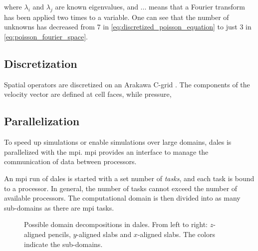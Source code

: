 where $\lambda_i$ and $\lambda_j$ are known eigenvalues, and ...  means that a Fourier transform has been applied two times to a variable. One can see that the number of unknowns has decreased from 7 in \autoref{eq:discretized_poisson_equation} to just 3 in \autoref{eq:poisson_fourier_space}. 

\subsection{Discretization}
Spatial operators are discretized on an Arakawa C-grid \citep{arakawaComputationalDesignBasic1977}. The components of the velocity vector are defined at cell faces, while pressure, 

\subsection{Parallelization}
To speed up simulations or enable simulations over large domains, \acrshort{dales} is parallelized with the \acrfull{mpi}. \acrshort{mpi} provides an interface to manage the communication of data between processors. 

An \acrshort{mpi} run of \acrshort{dales} is started with a set number of \emph{tasks}, and each task is bound to a processor. In general, the number of tasks cannot exceed the number of available processors. The computational domain is then divided into as many sub-domains as there are \acrshort{mpi} tasks. 

\begin{figure}[H]
    \centering
    
    \caption{Possible domain decompositions in \acrshort{dales}. From left to right: $z$-aligned pencils, $y$-aligned slabs and $x$-aligned slabs. The colors indicate the sub-domains.}
    \label{fig:dales_domain_decomposition}
\end{figure}